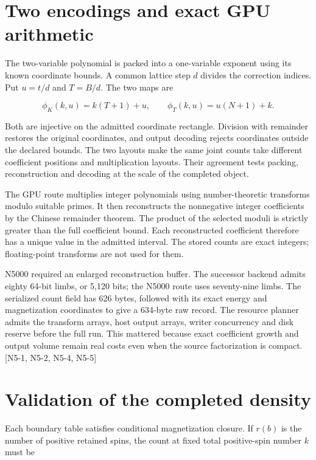 \section{Two encodings and exact GPU arithmetic}\label{two-encodings-and-exact-gpu-arithmetic}

The two-variable polynomial is packed into a one-variable exponent using its known coordinate bounds. A common lattice step \(d\) divides the correction indices. Put \(u=t/d\) and \(T=B/d\). The two maps are

\[\phi_K(k,u)=k(T+1)+u,\qquad \phi_T(k,u)=u(N+1)+k.\]

Both are injective on the admitted coordinate rectangle. Division with remainder restores the original coordinates, and output decoding rejects coordinates outside the declared bounds. The two layouts make the same joint counts take different coefficient positions and multiplication layouts. Their agreement tests packing, reconstruction and decoding at the scale of the completed object.

The GPU route multiplies integer polynomials using number-theoretic transforms modulo suitable primes. It then reconstructs the nonnegative integer coefficients by the Chinese remainder theorem. The product of the selected moduli is strictly greater than the full coefficient bound. Each reconstructed coefficient therefore has a unique value in the admitted interval. The stored counts are exact integers; floating-point transforms are not used for them.

N5000 required an enlarged reconstruction buffer. The successor backend admits eighty 64-bit limbs, or 5,120 bits; the N5000 route uses seventy-nine limbs. The serialized count field has 626 bytes, followed with its exact energy and magnetization coordinates to give a 634-byte raw record. The resource planner admits the transform arrays, host output arrays, writer concurrency and disk reserve before the full run. This mattered because exact coefficient growth and output volume remain real costs even when the source factorization is compact. {[}N5-1, N5-2, N5-4, N5-5{]}

\section{Validation of the completed density}\label{validation-of-the-completed-density}

Each boundary table satisfies conditional magnetization closure. If \(r(b)\) is the number of positive retained spins, the count at fixed total positive-spin number \(k\) must be

